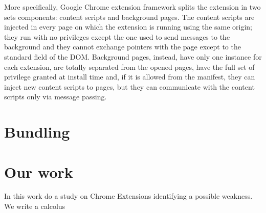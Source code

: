 More specifically, Google Chrome extension framework \cite{ChromeExtensionOnline} splits the extension in two sets components: content scripts and background pages. The content scripts are injected in every page on which the extension is running using the same origin; they run with no privileges except the one used to send messages to the background and they cannot exchange pointers with the page except to the standard field of the DOM. Background pages, instead, have only one instance for each extension, are totally separated from the opened pages, have the full set of privilege granted at install time and, if it is allowed from the manifest, they can inject new content scripts to pages, but they can communicate with the content scripts only via message passing.


\section{Bundling}
\label{sec:Bundling}

\section{Our work} 
\label{sec:OurWork}
In this work do a study on Chrome Extensions identifying a possible weakness. We write a calcolus 
